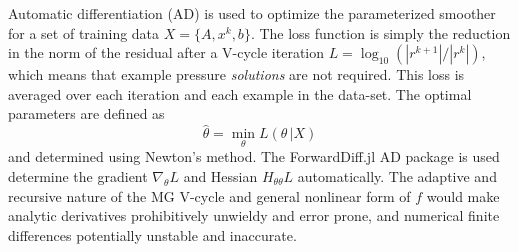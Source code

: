 \documentclass[review]{elsarticle}
\begin{document}
Automatic differentiation (AD) is used to optimize the parameterized smoother for a set of training data $X=\{A,x^k,b\}$. The loss function is simply the reduction in the norm of the residual after a V-cycle iteration $L = \log_{10}(|r^{k+1}| / |r^{k}|)$, which means that example pressure \textit{solutions} are not required. This loss is averaged over each iteration and each example in the data-set. The optimal parameters are defined as
\begin{equation}
    \hat\theta = \min_\theta L(\theta\, |X)
\end{equation}
and determined using Newton's method. The ForwardDiff.jl AD package is used determine the gradient $\nabla_\theta L$ and Hessian $H_{\theta\theta} L$ automatically. The adaptive and recursive nature of the MG V-cycle and general nonlinear form of $f$ would make analytic derivatives prohibitively unwieldy and error prone, and numerical finite differences potentially unstable and inaccurate.
\end{document}
